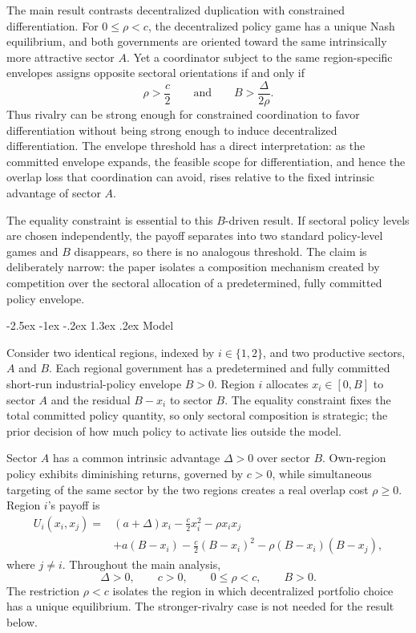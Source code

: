 \documentclass[12pt]{article}
\makeatletter
\renewcommand\section{\@startsection{section}{1}{\z@}%
  {-2.5ex \@plus -1ex \@minus -.2ex}%
  {1.3ex \@plus .2ex}%
  {\centering\normalfont\fontsize{14}{16}\selectfont\bfseries}}
\makeatother
\begin{document}
The main result contrasts decentralized duplication with constrained differentiation. For $0\le\rho<c$, the decentralized policy game has a unique Nash equilibrium, and both governments are oriented toward the same intrinsically more attractive sector $A$. Yet a coordinator subject to the same region-specific envelopes assigns opposite sectoral orientations if and only if
\[
\rho>\frac{c}{2}
\qquad\text{and}\qquad
B>\frac{\Delta}{2\rho}.
\]
Thus rivalry can be strong enough for constrained coordination to favor differentiation without being strong enough to induce decentralized differentiation. The envelope threshold has a direct interpretation: as the committed envelope expands, the feasible scope for differentiation, and hence the overlap loss that coordination can avoid, rises relative to the fixed intrinsic advantage of sector $A$.

The equality constraint is essential to this $B$-driven result. If sectoral policy levels are chosen independently, the payoff separates into two standard policy-level games and $B$ disappears, so there is no analogous threshold. The claim is deliberately narrow: the paper isolates a composition mechanism created by competition over the sectoral allocation of a predetermined, fully committed policy envelope.

\section{Model}

Consider two identical regions, indexed by $i\in\{1,2\}$, and two productive sectors, $A$ and $B$. Each regional government has a predetermined and fully committed short-run industrial-policy envelope $B>0$. Region $i$ allocates $x_i\in[0,B]$ to sector $A$ and the residual $B-x_i$ to sector $B$. The equality constraint fixes the total committed policy quantity, so only sectoral composition is strategic; the prior decision of how much policy to activate lies outside the model.

Sector $A$ has a common intrinsic advantage $\Delta>0$ over sector $B$. Own-region policy exhibits diminishing returns, governed by $c>0$, while simultaneous targeting of the same sector by the two regions creates a real overlap cost $\rho\ge 0$. Region $i$'s payoff is
\begin{equation}
\begin{split}
U_i(x_i,x_j)= {} &(a+\Delta)x_i-\frac{c}{2}x_i^2-\rho x_i x_j \\
&+a(B-x_i)-\frac{c}{2}(B-x_i)^2
-\rho(B-x_i)(B-x_j),
\end{split}
\label{eq:payoff}
\end{equation}
where $j\neq i$. Throughout the main analysis,
\begin{equation}
\Delta>0,\qquad c>0,\qquad 0\le \rho<c,\qquad B>0.
\label{eq:domain}
\end{equation}
The restriction $\rho<c$ isolates the region in which decentralized portfolio choice has a unique equilibrium. The stronger-rivalry case is not needed for the result below.
\end{document}

